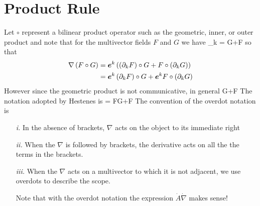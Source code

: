 \section{Product Rule} 
Let $\circ$ represent a bilinear product operator such as the geometric, inner, or outer product and
note that for the multivector fields $F$ and $G$ we have
\be
\partial_{k} = \circ G+F\circ{}
\ee
so that
\begin{align}
\nabla\left ( {F\circ G} \right ) &= \bm{e}^{k}\left ( {\left ( {\partial_{k}F} \right )\circ G+F\circ\left ( {\partial_{k}G} \right )} \right ) \nonumber \\
					   &= \bm{e}^{k}\left ( {\partial_{k}F} \right )\circ G+\bm{e}^{k}F\circ\left ( {\partial_{k}G} \right )
\end{align}
However since the geometric product is not communicative, in general
\be
\nabla{} \neq {}\circ G+F\circ{}
\ee
The notation adopted by Hestenes is
\be
\nabla{} = \nabla F\circ G+\dot{\nabla}F\circ {}
\ee
The convention of the overdot notation is
\begin{enumerate}
\item[{\it i.}] In the absence of brackets, $\nabla$ acts on the object to its immediate right
\item[{\it ii.}] When the $\nabla$ is followed by brackets, the derivative acts on all the the 
terms in the brackets.
\item[{\it iii.}] When the $\nabla$ acts on a multivector to which it is not adjacent, we use
overdots to describe the scope.

Note that with the overdot notation the expression $\dot{A}\dot{\nabla}$ makes sense!
\end{enumerate}

